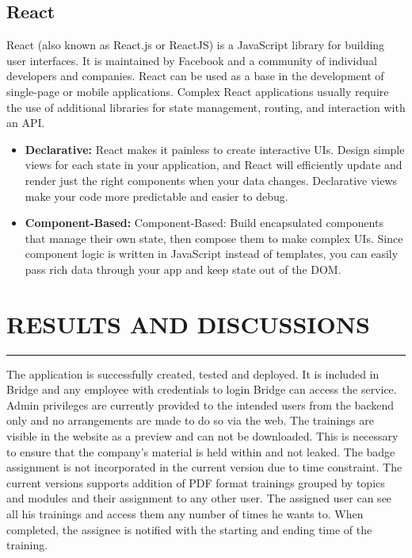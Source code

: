 \documentclass[a4paper,11pt]{article}
\begin{document}
\subsection{React}
React (also known as React.js or ReactJS) is a JavaScript library for building user interfaces. It is maintained by Facebook and a community of individual developers and companies. React can be used as a base in the development of single-page or mobile applications\cite{react}. Complex React applications usually require the use of additional libraries for state management, routing, and interaction with an API.
\begin{itemize}
    \item \textbf{Declarative: }React makes it painless to create interactive UIs. Design simple views for each state in your application, and React will efficiently update and render just the right components when your data changes. Declarative views make your code more predictable and easier to debug.

    \item \textbf{Component-Based: }Component-Based: Build encapsulated components that manage their own state, then compose them to make complex UIs. Since component logic is written in JavaScript instead of templates, you can easily pass rich data through your app and keep state out of the DOM.
\end{itemize}

\newpage
\section{RESULTS AND DISCUSSIONS}
\hrule
\vspace*{5mm}

The application is successfully created, tested and deployed. It is included in Bridge and any employee with credentials to login Bridge can access the service. Admin privileges are currently provided to the intended users from the backend only and no arrangements are made to do so via the web. The trainings are visible in the website as a preview and can not be downloaded. This is necessary to ensure that the company's material is held within and not leaked. The badge assignment is not incorporated in the current version due to time constraint. The current versions supports addition of PDF format trainings grouped by topics and modules and their assignment to any other user. The assigned user can see all his trainings and access them any number of times he wants to. When completed, the assignee is notified with the starting and ending time of the training.
\end{document}

